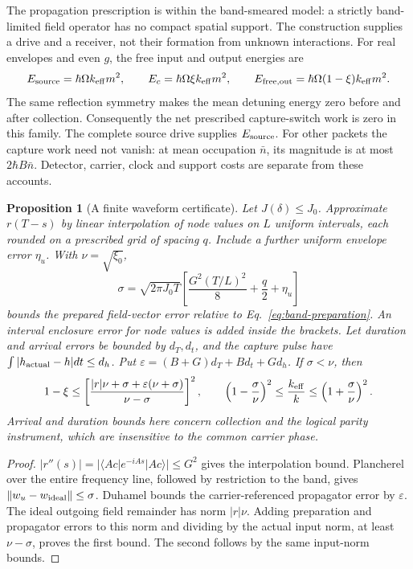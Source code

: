 \documentclass[aps,pre,onecolumn,superscriptaddress,floatfix,longbibliography]{revtex4-2}
\newtheorem{proposition}[theorem]{Proposition}
\begin{document}
The propagation prescription is within the band-smeared model: a strictly
band-limited field operator has no compact spatial support. The construction
supplies a drive and a receiver, not their formation from unknown interactions.
For real envelopes and even $g$, the free input and output energies are
\begin{equation}
 E_{\rm source}=\hbar\Omega k_{\rm eff}m^2,\qquad
 E_c=\hbar\Omega\xi k_{\rm eff}m^2,\qquad
 E_{\rm free,out}=\hbar\Omega(1-\xi)k_{\rm eff}m^2.
 \label{eq:band-energy}
\end{equation}
The same reflection symmetry makes the mean detuning energy zero before and
after collection. Consequently the net prescribed capture-switch work is
zero in this family. The complete source drive supplies $E_{\rm source}$.
For other packets the capture work need not vanish: at mean occupation
$\bar n$, its magnitude is at most $2\hbar B\bar n$.
Detector, carrier, clock and support costs are separate from these accounts.

\begin{proposition}[A finite waveform certificate]
\label{prop:band-certificate}
Let $J(\delta)\le J_0$. Approximate $r(T-s)$ by linear interpolation of
node values on $L$ uniform intervals, each rounded on a prescribed grid of
spacing $q$. Include a further uniform envelope error $\eta_u$. With
$\nu=\sqrt{\xi_0}$,
\[
 \sigma=\sqrt{2\pi J_0T}
       \left[\frac{G^2(T/L)^2}{8}+\frac q2+\eta_u\right]
\]
bounds the prepared field-vector error relative to
Eq.~\eqref{eq:band-preparation}. An interval enclosure error for node values
is added inside the brackets. Let duration and arrival errors be bounded by
$d_T,d_t$, and the capture pulse have
$\int|h_{\rm actual}-h|dt\le d_h$. Put
$\varepsilon=(B+G)d_T+Bd_t+Gd_h$. If $\sigma<\nu$, then
\begin{equation}
 1-\xi\le
 \left[\frac{|r|\nu+\sigma+\varepsilon(\nu+\sigma)}{\nu-\sigma}\right]^2,
 \qquad
 \left(1-\frac\sigma\nu\right)^2
 \le\frac{k_{\rm eff}}k\le
 \left(1+\frac\sigma\nu\right)^2.
 \label{eq:band-certificate}
\end{equation}
Arrival and duration bounds here concern collection and the logical parity
instrument, which are insensitive to the common carrier phase.
\end{proposition}
\begin{proof}
$|r''(s)|=|\langle Ac|e^{-iAs}|Ac\rangle|\le G^2$ gives the
interpolation bound. Plancherel over the entire frequency line, followed by
restriction to the band, gives $\|w_u-w_{\rm ideal}\|\le\sigma$.
Duhamel bounds the carrier-referenced propagator error by $\varepsilon$.
The ideal outgoing field remainder has norm $|r|\nu$.
Adding preparation and propagator errors to this norm and dividing by the
actual input norm, at least $\nu-\sigma$, proves the first bound.
The second follows by the same input-norm bounds.
\end{proof}
\end{document}
